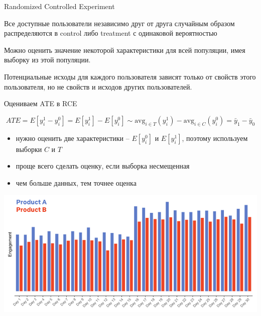 \documentclass[11pt,aspectratio=169,handout]{beamer}
\begin{document}
\begin{frame}{Randomized Controlled Experiment}

\begin{tcolorbox}[colback=info!5,colframe=info!80,title=Схема эксперимента]
Все доступные пользователи независимо друг от друга случайным образом распределяются в control либо treatment с одинаковой вероятностью
\end{tcolorbox}

\end{frame}

\begin{frame}{\phantom{Предположения RCE}}

\begin{tcolorbox}[colback=warn!5,colframe=warn!80,title=Предположение 1: ]
Можно оценить значение некоторой характеристики для всей популяции, имея выборку из этой популяции.
\end{tcolorbox}

\vfill

\begin{tcolorbox}[colback=warn!5,colframe=warn!80,title=Предположение 2: Stable Unit Treatment Value Assumption]
Потенциальные исходы для каждого пользователя зависят только от свойств этого пользователя, но не свойств и исходов других пользователей.
\end{tcolorbox}

\end{frame}

\begin{frame}{Оцениваем ATE в RCE}

\[
ATE = E[y_i^1 - y_i^0] = E[y_i^1] - E[y_i^0] \sim \text{avg}_{i \in T}(y_i^1) - \text{avg}_{i \in C}(y_i^0) = \bar y_1 - \bar y_0
\]

\begin{itemize}
\item нужно оценить две характеристики -- $E[y_i^0]$ и $E[y_i^1]$, поэтому используем выборки $C$ и $T$
\item проще всего сделать оценку, если выборка несмещенная
\item чем больше данных, тем точнее оценка
\end{itemize}

\end{frame}

\begin{frame}{}

\begin{center}
\includegraphics[scale=0.3]{images/yesexp.png}
\end{center}

\end{frame}
\end{document}
